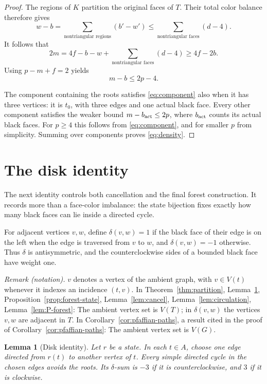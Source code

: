 \documentclass[11pt]{article}
\newtheorem{lemma}[theorem]{Lemma}
\theoremstyle{remark}
\numberwithin{equation}{section}
\begin{document}
\begin{proof}
The regions of \(K\) partition the original faces of \(T\).
Their total color balance therefore gives
\[
 w-b=\sum_{\text{nontriangular regions}}(b'-w')
       \le\sum_{\text{nontriangular faces}}(d-4).
\]
It follows that
\[
 2m=4f-b-w+\sum_{\text{nontriangular faces}}(d-4)
       \ge4f-2b.
\]
Using \(p-m+f=2\) yields
\begin{equation}\label{eq:component}
 m-b\le2p-4.
\end{equation}

The component containing the roots satisfies
\eqref{eq:component} also when it has three vertices:
it is \(t_0\), with three edges and one actual black face.
Every other component satisfies the weaker bound
\(m-b_{\rm act}\le2p\), where \(b_{\rm act}\) counts its
actual black faces. For \(p\ge4\) this follows from
\eqref{eq:component}, and for smaller \(p\) from simplicity.
Summing over components proves \eqref{eq:density}.
\end{proof}

\section{The disk identity}\label{sec:disk}

The next identity controls both cancellation and the final forest
construction. It records more than a face-color imbalance: the state
bijection fixes exactly how many black faces can lie inside a directed
cycle.

For adjacent vertices \(v,w\), define
\(\delta(v,w)=1\) if the black face of their edge is on the
left when the edge is traversed from \(v\) to \(w\), and
\(\delta(v,w)=-1\) otherwise. Thus \(\delta\) is antisymmetric,
and the counterclockwise sides of a bounded black face have
weight one.

\noindent\textit{Remark (notation).} $v$ denotes a vertex of the ambient graph, with $v\in V(t)$ whenever it indexes an incidence $(t,v)$. In Theorem~\ref{thm:partition}, Lemma~\ref{lem:disk}, Proposition~\ref{prop:forest-state}, Lemma~\ref{lem:cancel}, Lemma~\ref{lem:circulation}, Lemma~\ref{lem:P-forest}: The ambient vertex set is $V(T)$; in $\delta(v,w)$ the vertices $v,w$ are adjacent in $T$. In Corollary~\ref{cor:pfaffian-paths}, a result cited in the proof of Corollary~\ref{cor:pfaffian-paths}: The ambient vertex set is $V(G)$.


\begin{lemma}[Disk identity]\label{lem:disk}
Let \(r\) be a state. In each \(t\in A\), choose one edge
directed from \(r(t)\) to another vertex of \(t\).
Every simple directed cycle in the chosen edges avoids the
roots. Its \(\delta\)-sum is \(-3\) if it is counterclockwise,
and \(3\) if it is clockwise.
\end{lemma}
\end{document}

